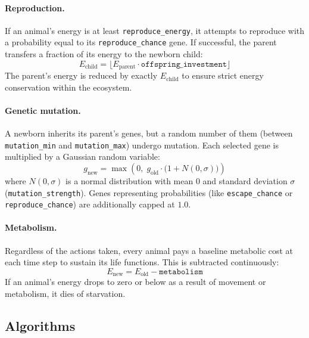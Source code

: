 \documentclass[english]{projectreport}
\begin{document}
\paragraph{Reproduction.} If an animal's energy is at least \texttt{reproduce\_energy}, it attempts to reproduce with a probability equal to its \texttt{reproduce\_chance} gene. If successful, the parent transfers a fraction of its energy to the newborn child:
\begin{equation}
E_{\text{child}} = \lfloor E_{\text{parent}} \cdot \texttt{offspring\_investment} \rfloor
\label{eq:reproduce}
\end{equation}
The parent's energy is reduced by exactly $E_{\text{child}}$ to ensure strict energy conservation within the ecosystem.

\paragraph{Genetic mutation.} A newborn inherits its parent's genes, but a random number of them (between \texttt{mutation\_min} and \texttt{mutation\_max}) undergo mutation. Each selected gene is multiplied by a Gaussian random variable:
\begin{equation}
g_{\text{new}} = \max\left(0,\; g_{\text{old}} \cdot \bigl(1 + N(0, \sigma)\bigr)\right)
\label{eq:mutation}
\end{equation}
where $N(0, \sigma)$ is a normal distribution with mean $0$ and standard deviation $\sigma$ (\texttt{mutation\_strength}). Genes representing probabilities (like \texttt{escape\_chance} or \texttt{reproduce\_chance}) are additionally capped at $1.0$.

\paragraph{Metabolism.} Regardless of the actions taken, every animal pays a baseline metabolic cost at each time step to sustain its life functions. This is subtracted continuously:
\begin{equation}
E_{\text{new}} = E_{\text{old}} - \texttt{metabolism}
\label{eq:metabolism}
\end{equation}
If an animal's energy drops to zero or below as a result of movement or metabolism, it dies of starvation.


\subsection{Algorithms}
\label{sec:algorithms}
\end{document}
